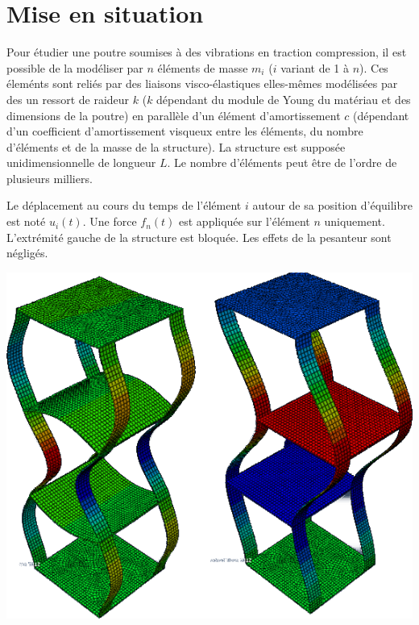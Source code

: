 \documentclass[10pt]{article}
\newif\ifxp
\begin{document}
\ifxp

\else

\fi



 \renewcommand{\baselinestretch}{1.2}
\setlength{\parskip}{2ex plus 0.5ex minus 0.2ex}



\section{Mise en situation}

\begin{minipage}[c]{.7\linewidth}
Pour étudier une poutre soumises à des vibrations en traction compression, il est possible de la modéliser par $n$ éléments de masse $m_i$ ($i$ variant de 1 à $n$). Ces éleménts sont reliés par des liaisons visco-élastiques elles-mêmes modélisées par des un ressort de raideur $k$ ($k$ dépendant du module de Young du matériau et des dimensions de la poutre) en parallèle d'un élément d'amortissement $c$ (dépendant d'un coefficient d'amortissement visqueux entre les éléments, du nombre d'éléments et de la masse de la structure). La structure est supposée unidimensionnelle de longueur $L$. Le nombre d'éléments peut être de l'ordre de plusieurs milliers. 

Le déplacement au cours du temps de l'élément $i$ autour de sa position d'équilibre est noté $u_i(t)$. Une force $f_n(t)$ est appliquée sur l'élément $n$ uniquement. L'extrémité gauche de
la structure est bloquée. Les effets de la pesanteur sont négligés.
\end{minipage}
\begin{minipage}[c]{.27\linewidth}
\begin{center}
\includegraphics[width=.95\textwidth]{images/vibrations}
\end{center}
\end{minipage}
\end{document}

